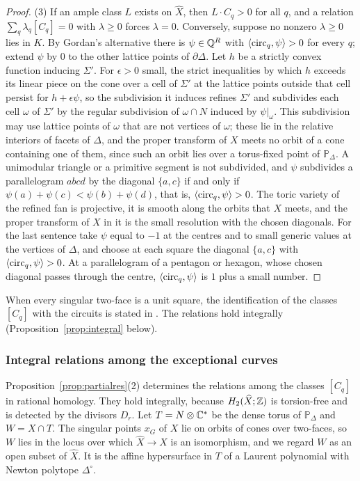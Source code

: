 \begin{proof}
(3) If an ample class $L$ exists on $\widehat X$, then $L\cdot C_q>0$ for all $q$, and a relation
$\sum_q\lambda_q[C_q]=0$ with $\lambda\ge0$ forces $\lambda=0$. Conversely, suppose no nonzero $\lambda\ge0$ lies in $K$. By
Gordan's alternative there is $\psi\in\mathbb Q^R$ with $\langle\mathrm{circ}_q,\psi\rangle>0$ for every $q$; extend $\psi$ by $0$ to the
other lattice points of $\partial\Delta$. Let $h$ be a strictly convex function inducing $\Sigma'$. For $\epsilon>0$ small,
the strict inequalities by which $h$ exceeds its linear piece on the cone over a cell of $\Sigma'$ at the lattice points
outside that cell persist for $h+\epsilon\psi$, so the subdivision it induces refines $\Sigma'$ and subdivides each cell
$\omega$ of $\Sigma'$ by the regular subdivision of $\omega\cap N$ induced by $\psi|_\omega$. This subdivision may use
lattice points of $\omega$ that are not vertices of $\omega$; these lie in the relative interiors of facets of $\Delta$,
and the proper transform of $X$ meets no orbit of a cone containing one of them, since such an orbit lies over a
torus-fixed point of $\mathbb P_\Delta$. A unimodular triangle or a primitive segment is not subdivided, and $\psi$ subdivides a parallelogram $abcd$ by the diagonal
$\{a,c\}$ if and only if $\psi(a)+\psi(c)<\psi(b)+\psi(d)$, that is, $\langle\mathrm{circ}_q,\psi\rangle>0$. The toric variety of
the refined fan is projective, it is smooth along the orbits that $X$ meets, and the proper transform of $X$ in it is the
small resolution with the chosen diagonals. For the last sentence take $\psi$ equal to $-1$ at the centres and to small
generic values at the vertices of $\Delta$, and choose at each square the diagonal $\{a,c\}$ with $\langle\mathrm{circ}_q,\psi\rangle>0$.
At a parallelogram of a pentagon or hexagon, whose chosen diagonal passes through the centre, $\langle\mathrm{circ}_q,\psi\rangle$ is
$1$ plus a small number.
\end{proof}

When every singular two-face is a unit square, the identification of the classes $[C_q]$ with the circuits is stated in
\cite[\S2]{BK10}. The relations hold integrally (Proposition~\ref{prop:integral} below).

\subsubsection*{Integral relations among the exceptional curves}

Proposition~\ref{prop:partialres}(2) determines the relations among the classes $[C_q]$ in rational homology. They
hold integrally, because $H_2(\widehat X;\mathbb Z)$ is torsion-free and is detected by the divisors $D_r$. Let $T=N\otimes\mathbb C^*$
be the dense torus of $\mathbb P_\Delta$ and $W=X\cap T$. The singular points $x_G$ of $X$ lie on orbits of cones over
two-faces, so $W$ lies in the locus over which $\widehat X\to X$ is an isomorphism, and we regard $W$ as an open subset
of $\widehat X$. It is the affine hypersurface in $T$ of a Laurent polynomial with Newton polytope $\Delta^\circ$.

